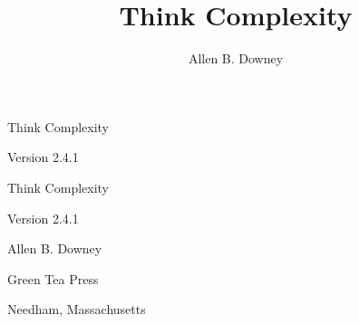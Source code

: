 \documentclass[12pt]{book}
\title{Think Complexity}
\author{Allen B. Downey}
\newcommand{\thetitle}{Think Complexity}
\newcommand{\theauthors}{Allen B. Downey}
\newcommand{\theversion}{2.4.1}
\theoremstyle{exercise}
\newcommand\blankpage{%
    \null
    \thispagestyle{empty}%
    \addtocounter{page}{-1}%
    \newpage}
\newif\ifplastex
\begin{document}
\frontmatter

\ifplastex

\maketitle

\else

\begin{latexonly}

\thispagestyle{empty}

\begin{flushright}
\vspace*{2.0in}

\begin{spacing}{3}
{\huge \thetitle}
\end{spacing}

\vspace{0.25in}

Version \theversion

\vfill

\end{flushright}


\afterpage{\blankpage}


\pagebreak
\thispagestyle{empty}

\begin{flushright}
\vspace*{2.0in}

\begin{spacing}{3}
{\huge \thetitle}
\end{spacing}

\vspace{0.25in}

Version \theversion

\vspace{1in}


{\Large
\theauthors \\
}


\vspace{0.5in}

{\Large Green Tea Press}

{\small Needham, Massachusetts}


\end{flushright}
\end{latexonly}
\end{document}
